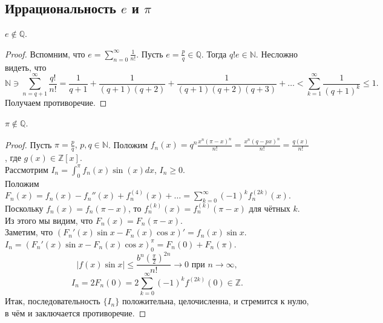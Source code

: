 \subsection{Иррациональность $e$ и $\pi$}
\begin{theorem} \label{l9_thm_e_irr}
	$e \not\in \mathbb{Q}$.
\end{theorem}
\begin{proof}
	Вспомним, что $\displaystyle e = \sum_{n=0}^{\infty} \frac{1}{n!}$. Пусть $e = \frac{p}{q} \in \mathbb{Q}$. Тогда $q! e \in \mathbb{N}$. Несложно видеть, что 
	$$\mathbb{N} \ni \sum_{n = q + 1}^{\infty} \frac{q!}{n!} = \frac{1}{q + 1} + \frac{1}{(q + 1)(q+2)} + \frac{1}{(q+1)(q+2)(q+3)} + \ldots < \sum_{k = 1}^{\infty} \frac{1}{(q+1)^k} \leq 1.$$
	Получаем противоречие.
\end{proof}

\begin{theorem} \label{l9_thm_pi_irr}
	$\pi \not \in \mathbb{Q}$.
\end{theorem}
\begin{proof}
	Пусть $\pi = \frac{p}{q}, \, p,q \in \mathbb{N}$. 
	Положим $\displaystyle f_n(x) = q^n \frac{x^n (\pi - x)^n}{n!} = \frac{x^n (q - px)^n}{n!} = \frac{q(x)}{n!}$, где $g(x) \in \mathbb{Z}[x]$.\\
	Рассмотрим $\displaystyle I_n = \int_{0}^{\pi} f_n(x) \sin(x) dx$, $I_n \geq 0$.\\
	Положим $\displaystyle F_n(x) = f_n(x) - f_n''(x) + f_n^{(4)}(x) + \ldots = \sum_{k = 0}^{\infty} (-1)^k f_n^{(2k)}(x)$.\\
	Поскольку $f_n(x) = f_n(\pi - x)$, то $f_n^{(k)}(x) = f_n^{(k)}(\pi - x)$ для чётных $k$. Из этого мы видим, что $F_n(x) = F_n(\pi - x)$.\\
	Заметим, что $\left( F_n'(x) \sin x - F_n(x) \cos x\right)' = f_n(x) \sin x$.\\
	$I_n = \left(F_n'(x) \sin x - F_n(x) \cos x \right)_{0}^{\pi} = F_n(0) + F_n(\pi)$.\\
	$$|f(x) \sin x| \leq \frac{b^n \left( \frac{\pi}{2}\right)^{2n}}{n!} \rightarrow 0 \text{ при } n \rightarrow \infty,$$
	$$I_n = 2F_n(0) = 2 \sum_{k=0}^{\infty} (-1)^kf^{(2k)}(0) \in \mathbb{Z}.$$
	Итак, последовательность $\lbrace I_n \rbrace$ положительна, целочисленна, и стремится к нулю, в чём и заключается противоречие.
\end{proof}